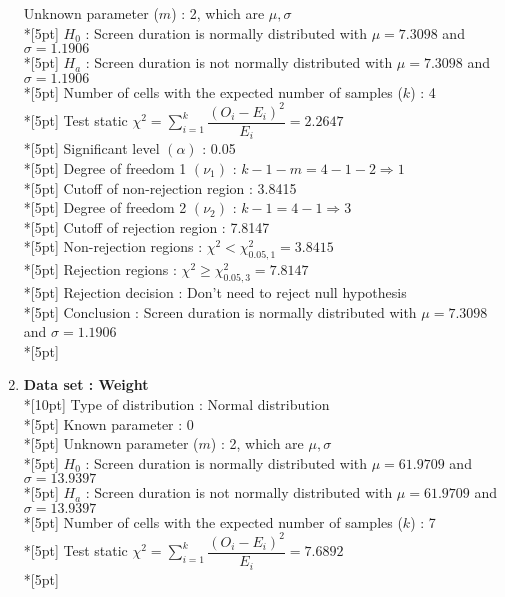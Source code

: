 \begin{enumerate}
        Unknown parameter ($m$) : 2, which are \(\mu, \sigma\)\\*[5pt]
        $H_0$ : Screen duration is normally distributed with $\mu=7.3098$ and $\sigma=1.1906$\\*[5pt]
        $H_a$ : Screen duration is not normally distributed with $\mu=7.3098$ and $\sigma=1.1906$\\*[5pt]
        Number of cells with the expected number of samples ($k$) : 4\\*[5pt]
        Test static \(\chi^2=\displaystyle\sum\limits^k_{i=1}\dfrac{\left(O_i-E_i\right)^2}{E_i}=2.2647\)\\*[5pt]
        Significant level \(\left(\alpha\right)\) : 0.05\\*[5pt]
        Degree of freedom 1 \((\nu_1)\) : $k - 1 - m = 4 - 1 - 2 \Rightarrow 1$\\*[5pt]
        Cutoff of non-rejection region : 3.8415\\*[5pt]
        Degree of freedom 2 \((\nu_2)\) : $k - 1 = 4 - 1 \Rightarrow 3$\\*[5pt]
        Cutoff of rejection region : 7.8147\\*[5pt]
        Non-rejection regions : \(\chi^2 < \chi^2_{0.05, 1}=3.8415\)\\*[5pt]
        Rejection regions : \(\chi^2 \geq \chi^2_{0.05, 3}=7.8147\)\\*[5pt]
        Rejection decision : Don't need to reject null hypothesis\\*[5pt]
        Conclusion : Screen duration is normally distributed with $\mu=7.3098$ and $\sigma=1.1906$\\*[5pt]
    \item \textbf{Data set : Weight}\\*[10pt]
        Type of distribution : Normal distribution\\*[5pt]
        Known parameter : 0\\*[5pt]
        Unknown parameter ($m$) : 2, which are \(\mu, \sigma\)\\*[5pt]
        $H_0$ : Screen duration is normally distributed with $\mu=61.9709$ and $\sigma=13.9397$\\*[5pt]
        $H_a$ : Screen duration is not normally distributed with $\mu=61.9709$ and $\sigma=13.9397$\\*[5pt]
        Number of cells with the expected number of samples ($k$) : 7\\*[5pt]
        Test static \(\chi^2=\displaystyle\sum\limits^k_{i=1}\dfrac{\left(O_i-E_i\right)^2}{E_i}=7.6892\)\\*[5pt]

\end{enumerate}
